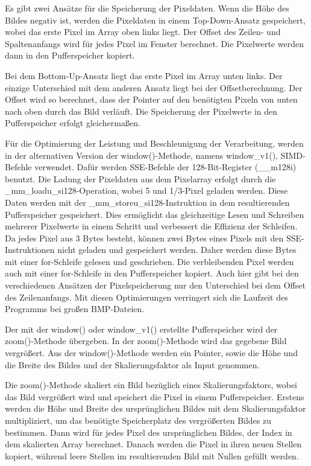 \documentclass[course=erap]{aspdoc}
\begin{document}
    Es gibt zwei Ansätze für die Speicherung der Pixeldaten. Wenn die Höhe des Bildes negativ ist, werden die Pixeldaten in
    einem Top-Down-Ansatz gespeichert, wobei das erste Pixel im Array oben links liegt. Der Offset des Zeilen- und Spaltenanfangs
    wird für jedes Pixel im Fenster berechnet. Die Pixelwerte werden dann in den Pufferspeicher kopiert.

    Bei dem Bottom-Up-Ansatz liegt das erste Pixel im Array unten links. Der einzige Unterschied mit dem anderen Ansatz liegt bei der
    Offsetberechnung. Der Offset wird so berechnet, dass der Pointer auf den benötigten Pixeln von unten nach oben durch das Bild verläuft.
    Die Speicherung der Pixelwerte in den Pufferspeicher erfolgt gleichermaßen.

    Für die Optimierung der Leistung und Beschleunigung der Verarbeitung, werden in der alternativen Version der window()-Methode,
    namens window\_v1(), SIMD-Befehle verwendet. Dafür werden SSE-Befehle der 128-Bit-Register (\_\_m128i)
    benutzt. Die Ladung der Pixeldaten aus dem Pixelarray erfolgt durch die \_mm\_loadu\_si128-Operation, wobei 5 und 1/3-Pixel geladen
    werden. Diese Daten werden mit der \_mm\_storeu\_si128-Instruktion in dem resultierenden Pufferspeicher gespeichert.
    Dies ermöglicht das gleichzeitige Lesen und Schreiben mehrerer Pixelwerte in einem Schritt und verbessert die Effizienz der Schleifen.
    Da jedes Pixel aus 3 Bytes besteht, können zwei Bytes eines Pixels mit den SSE-Instruktionen nicht geladen und gespeichert werden.
    Daher werden diese Bytes mit einer for-Schleife gelesen und geschrieben. Die verbleibenden Pixel werden auch mit einer for-Schleife
    in den Pufferspeicher kopiert. Auch hier gibt bei den verschiedenen Ansätzen der Pixelspeicherung nur den Unterschied bei dem Offset
    des Zeilenanfangs. Mit diesen Optimierungen verringert sich die Laufzeit des Programms bei großen BMP-Dateien.

    Der mit der window() oder window\_v1() erstellte Pufferspeicher wird der zoom()-Methode übergeben.
    In der zoom()-Methode wird das gegebene Bild vergrößert. Aus der window()-Methode werden ein Pointer,
    sowie die Höhe und die Breite des Bildes und der Skalierungsfaktor als Input genommen.

    Die zoom()-Methode skaliert ein Bild bezüglich eines Skalierungsfaktors, wobei das Bild vergrößert wird und speichert die Pixel in einem
    Pufferspeicher. Erstens werden die Höhe und Breite des ursprünglichen Bildes mit dem Skalierungsfaktor multipliziert,
    um das benötigte Speicherplatz des vergrößerten Bildes zu bestimmen.
    Dann wird für jedes Pixel des ursprünglichen Bildes, der Index in dem skalierten Array berechnet.
    Danach werden die Pixel in ihren neuen Stellen kopiert, während leere Stellen im resultierenden Bild mit Nullen gefüllt werden.
\end{document}
